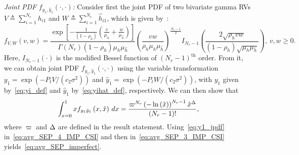 \documentclass[12pt,draftcls,peerreview,onecolumn]{IEEEtran}
\newcommand{\define}{\triangleq}
\newcommand{\muh}{{\mu_{h}}}
\newcommand{\Nr}{{N_r}}
\newcommand{\Pt}{{P_t}}
\newcommand{\such}{h}
\newcommand{\hk}[1]{{\such_{#1}}}
\newcommand{\noisevar}{\sigma^2}
\newcommand{\ctwo}{c_{2}}
\newcommand{\yk}[1]{y_{#1}}
\newcommand{\snr}{\Omega}
\newcommand{\snrhat}{\widehat{\snr}}
\newcommand{\hhat}{\hat{\such}}
\newcommand{\hkhat}[1]{\hhat_{#1}}
\newcommand{\ykhat}[1]{\hat{y}_{#1}}
\newcommand{\muhhat}{\mu_{\hhat}}
\newcommand{\rhoh}{\rho_h}
\newcommand{\T}{\varpi}
\newcommand{\xhat}{\hat{x}}
\newcommand{\sumnr}{\sum_{i=1}^{\Nr}}
\begin{document}
{\em Joint PDF $f_{\yk{1},\ykhat{1}}\left(\cdot,\cdot\right)$:} Consider first the joint PDF of two bivariate gamma RVs $V\define\sumnr\hk{i1}$ and $W\define\sumnr\hkhat{i1}$, which is given by~\cite[(6.1)]{simon_alouini_book}:
\begin{equation}
\label{eq:bivargammaPDF}
f_{V,W}(v,w) = \frac{\exp\left[{-\frac{1}{(1-\rhoh)}\left( \frac{v}{\muh}+\frac{w}{\muhhat}\right) } \right]}{\Gamma\left(\Nr \right) \left(1-\rhoh \right)\muh\muhhat }\left(\frac{vw}{\rhoh \muh\muhhat}\right)^{\frac{\Nr-1}{2}}  I_{\Nr-1}\left(\frac{2\sqrt{\rhoh vw}}{(1-\rhoh)\sqrt{\muh\muhhat}}\right),~v, w \geq 0.
\end{equation}
%  
Here, $I_{\Nr-1}\left(\cdot \right) $ is the modified Bessel function of $(\Nr-1)^{\text{th}}$ order. From it, we can obtain joint PDF $f_{\yk{1},\ykhat{1}}\left(\cdot,\cdot\right)$ using the variable transformation $\yk{1}=\exp\left(-\Pt V/(\ctwo\noisevar)\right)$ and $\ykhat{1}=\exp\left(-\Pt W/(\ctwo\noisevar) \right)$, with $\yk{1}$ given by~\eqref{eq:yi_def} and $\ykhat{1}$ by~\eqref{eq:yihat_def}, respectively.  
%
% 
We can then show that %
\begin{equation}
\label{eq:y1_jpdf}
\int_{x=0}^{1} x f_{\yk{1}\ykhat{1}}\left(x,\xhat\right)\,dx = \frac{\T^{\Nr}\left(-\ln\left({\xhat} \right)\right)^{\Nr-1}\xhat^{\D}}{(\Nr-1)!},
\end{equation}
where $\T$ and $\Delta$ are defined in the result statement. Using~\eqref{eq:y1_jpdf}  in~\eqref{eq:avg_SEP_4_IMP_CSI} and then in~\eqref{eq:avg_SEP_3_IMP_CSI}  yields~\eqref{eq:avg_SEP_imperfect}.
\end{document}
